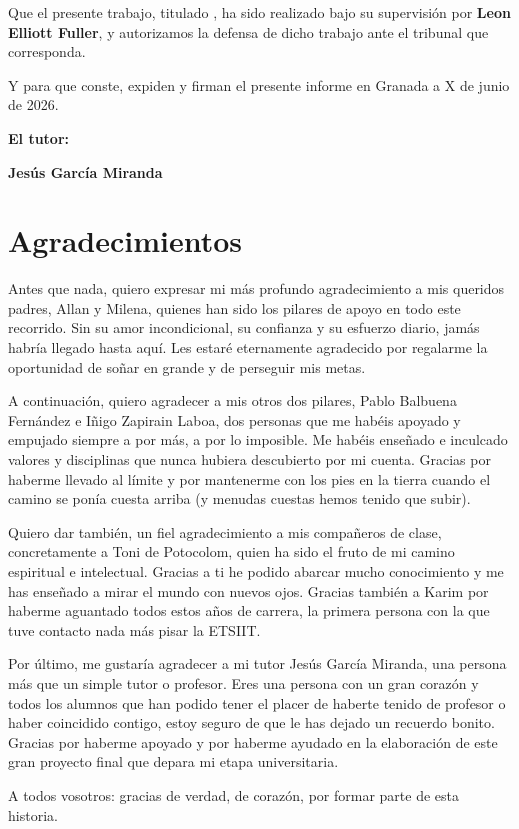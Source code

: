 Que el presente trabajo, titulado \textit{\textbf{\myTitle}},
ha sido realizado bajo su supervisión por \textbf{Leon Elliott Fuller}, y autorizamos la defensa de dicho trabajo ante el tribunal
que corresponda.

\vspace{0.5cm}

Y para que conste, expiden y firman el presente informe en Granada a X de junio de 2026.

\vspace{1cm}

\textbf{El tutor:}

\vspace{5cm}

\noindent \textbf{Jesús García Miranda}

\chapter*{Agradecimientos}
\thispagestyle{empty}

       \vspace{1cm}


Antes que nada, quiero expresar mi más profundo agradecimiento a mis queridos padres, Allan y Milena, quienes han sido los pilares de apoyo en todo este recorrido. Sin su amor incondicional, su confianza y su esfuerzo diario, jamás habría llegado hasta aquí. Les estaré eternamente agradecido por regalarme la oportunidad de soñar en grande y de perseguir mis metas.

A continuación, quiero agradecer a mis otros dos pilares, Pablo Balbuena Fernández e Iñigo Zapirain Laboa, dos personas que me habéis apoyado y empujado siempre a por más, a por lo imposible. Me habéis enseñado e inculcado valores y disciplinas que nunca hubiera descubierto por mi cuenta. Gracias por haberme llevado al límite y por mantenerme con los pies en la tierra cuando el camino se ponía cuesta arriba (y menudas cuestas hemos tenido que subir).

Quiero dar también, un fiel agradecimiento a mis compañeros de clase, concretamente a Toni de Potocolom, quien ha sido el fruto de mi camino espiritual e intelectual. Gracias a ti he podido abarcar mucho conocimiento y me has enseñado a mirar el mundo con nuevos ojos. Gracias también a Karim por haberme aguantado todos estos años de carrera, la primera persona con la que tuve contacto nada más pisar la ETSIIT.

Por último, me gustaría agradecer a mi tutor Jesús García Miranda, una persona más que un simple tutor o profesor. Eres una persona con un gran corazón y todos los alumnos que han podido tener el placer de haberte tenido de profesor o haber coincidido contigo, estoy seguro de que le has dejado un recuerdo bonito. Gracias por haberme apoyado y por haberme ayudado en la elaboración de este gran proyecto final que depara mi etapa universitaria.

A todos vosotros: gracias de verdad, de corazón, por formar parte de esta historia.